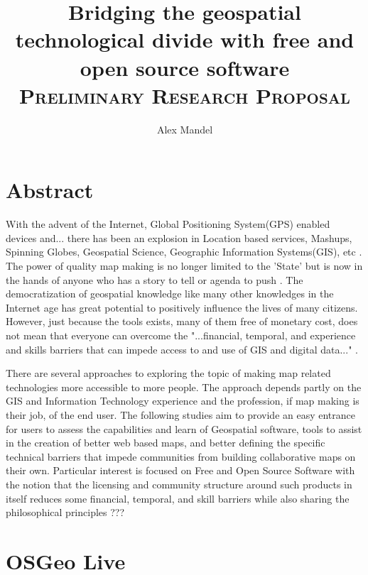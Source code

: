 \documentclass[12pt,letterpaper]{article}
\author{Alex Mandel}
\title{Bridging the geospatial technological divide with free and open source software
\\	
\textsc{\small Preliminary Research Proposal}\\[0.5cm]
}
\begin{document}
\maketitle
\section{Abstract}

	With the advent of the Internet, Global Positioning System(GPS) enabled devices and... there has been an explosion in Location based services, Mashups, Spinning Globes, Geospatial Science, Geographic Information Systems(GIS), etc . The power of quality map making is no longer limited to the 'State' but is now in the hands of anyone who has a story to tell or agenda to push \parencite{Wood2010}. The democratization of geospatial knowledge like many other knowledges in the Internet age has great potential to positively influence the lives of many citizens. However, just because the tools exists, many of them free of monetary cost, does not mean that everyone can overcome the "...financial, temporal, and experience and skills barriers that can impede access to and use of GIS and digital data..." \parencite{Elwood2006}. 


	There are several approaches to exploring the topic of making map related technologies more accessible to more people. The approach depends partly on the GIS and Information Technology experience and the profession, if map making is their job, of the end user. The following studies aim to provide an easy entrance for users to assess the capabilities and learn of Geospatial software, tools to assist in the creation of better web based maps, and better defining the specific technical barriers that impede communities from building collaborative maps on their own. Particular interest is focused on Free and Open Source Software with the notion that the licensing and community structure around such products in itself reduces some financial, temporal, and skill barriers while also sharing the philosophical principles ??? 

\tableofcontents
\section{OSGeo Live}
\end{document}
